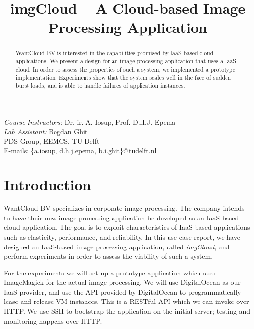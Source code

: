 \documentclass[conference]{IEEEtran}
\begin{document}
\title{imgCloud -- A Cloud-based Image Processing Application}

\author{
    \and
}

\maketitle


\begin{abstract}
WantCloud BV is interested in the capabilities promised by IaaS-based cloud applications. We present a design for an image processing application that uses a IaaS cloud. In order to assess the properties of such a system, we implemented a prototype implementation. Experiments show that the system scales well in the face of sudden burst loads, and is able to handle failures of application instances.
\end{abstract}

\IEEEpeerreviewmaketitle

\begin{center}
\emph{Course Instructors:} Dr. ir. A. Iosup, Prof. D.H.J. Epema\\
\emph{Lab Assistant:} Bogdan Ghit\\
PDS Group, EEMCS, TU Delft\\
E-mails: \{a.iosup, d.h.j.epema, b.i.ghit\}@tudelft.nl
\end{center}

\section{Introduction}
WantCloud BV specializes in corporate image processing. The company intends to have their new image processing application be developed as an IaaS-based cloud application. The goal is to exploit characteristics of IaaS-based applications such as elasticity, performance, and reliability. In this use-case report, we have designed an IaaS-based image processing application, called \emph{imgCloud}, and perform experiments in order to assess the viability of such a system.

For the experiments we will set up a prototype application which uses ImageMagick \cite{image-magick} for the actual image processing. We will use DigitalOcean \cite{digital-ocean} as our IaaS provider, and use the API provided by DigitalOcean to programmatically lease and release VM instances. This is a RESTful API which we can invoke over HTTP. We use SSH to bootstrap the application on the initial server; testing and monitoring happens over HTTP.
\end{document}
